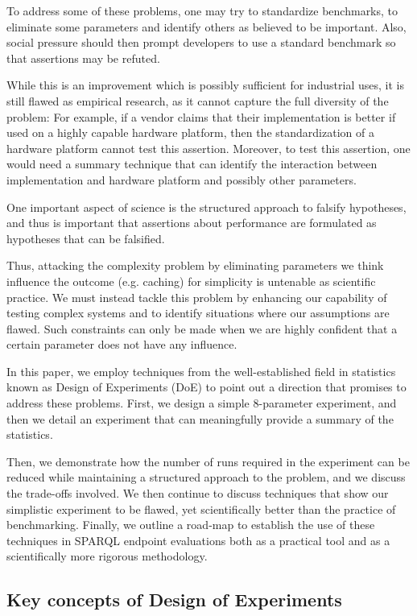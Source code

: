 \documentclass{llncs}
\begin{document}
To address some of these problems, one may try to standardize
benchmarks, to eliminate some parameters and identify others as
believed to be important. Also, social pressure should then prompt
developers to use a standard benchmark so that assertions may be
refuted.

While this is an improvement which is possibly sufficient for
industrial uses, it is still flawed as empirical research, as it
cannot capture the full diversity of the problem: For example, if a
vendor claims that their implementation is better if used on a highly
capable hardware platform, then the standardization of a hardware
platform cannot test this assertion. Moreover, to test this assertion,
one would need a summary technique that can identify the interaction
between implementation and hardware platform and possibly other
parameters.

One important aspect of science is the structured approach to falsify
hypotheses, and thus is important that assertions about performance
are formulated as hypotheses that can be falsified.

Thus, attacking the complexity problem by eliminating parameters we
think influence the outcome (e.g. caching) for simplicity is untenable
as scientific practice. We must instead tackle this problem by
enhancing our capability of testing complex systems and to identify
situations where our assumptions are flawed. Such constraints can only
be made when we are highly confident that a certain parameter does not
have any influence.

In this paper, we employ techniques from the well-established field in
statistics known as Design of Experiments (DoE) to point out a
direction that promises to address these problems. First, we design a
simple 8-parameter experiment, and then we detail an experiment that
can meaningfully provide a summary of the statistics.

Then, we demonstrate how the number of runs required in the experiment
can be reduced while maintaining a structured approach to the problem,
and we discuss the trade-offs involved. We then continue to discuss
techniques that show our simplistic experiment to be flawed, yet
scientifically better than the practice of benchmarking. Finally, we
outline a road-map to establish the use of these techniques in SPARQL
endpoint evaluations both as a practical tool and as a scientifically
more rigorous methodology.

\subsection{Key concepts of Design of Experiments}
\end{document}
